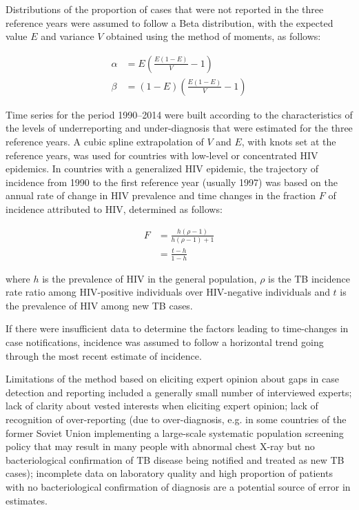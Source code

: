 Distributions of the proportion of cases that were not reported in the three reference years were assumed to follow a Beta distribution, with the expected value $E$ and variance $V$ obtained using the method of moments\cite{Renyi2007}, as follows: 

\begin{align}
\alpha &= E (\frac{E(1-E)}{V} - 1) \\
\beta  &= (1-E)(\frac{E(1-E)}{V} - 1)
\end{align}

Time series for the period 1990–2014 were built according to the characteristics of the levels of underreporting and under-diagnosis that were estimated for the three reference years. A cubic spline extrapolation of $V$ and $E$, with knots set at the reference years, was used for countries with low-level or concentrated HIV epidemics. In countries with a generalized HIV epidemic, the trajectory of incidence from 1990 to the first reference year (usually 1997) was based on the annual rate of change in HIV prevalence and time changes in the fraction $F$ of incidence attributed to HIV, determined as follows:

\begin{align*}
F &= \frac{h(\rho - 1)}{h(\rho - 1) + 1} \\
  &= \frac{t - h}{1 - h}
\end{align*}

where $h$ is the prevalence of HIV in the general population, $\rho$ is the TB incidence rate ratio among HIV-positive individuals over HIV-negative individuals and $t$ is the prevalence of HIV among new TB cases.

If there were insufficient data to determine the factors leading to time-changes in case notifications, incidence was assumed to follow a horizontal trend going through the most recent estimate of incidence. 

Limitations of the method based on eliciting expert opinion about gaps in case detection and reporting included a generally small number of interviewed experts; lack of clarity about vested interests when eliciting expert opinion; lack of recognition of over-reporting (due to over-diagnosis,  e.g. in some countries of the former Soviet Union implementing a large-scale systematic population screening policy that may result in many people with abnormal chest X-ray but no bacteriological confirmation of TB disease being notified and treated as new TB cases); incomplete data on laboratory quality and high proportion of patients with no bacteriological confirmation of diagnosis are a potential source of error in estimates.



